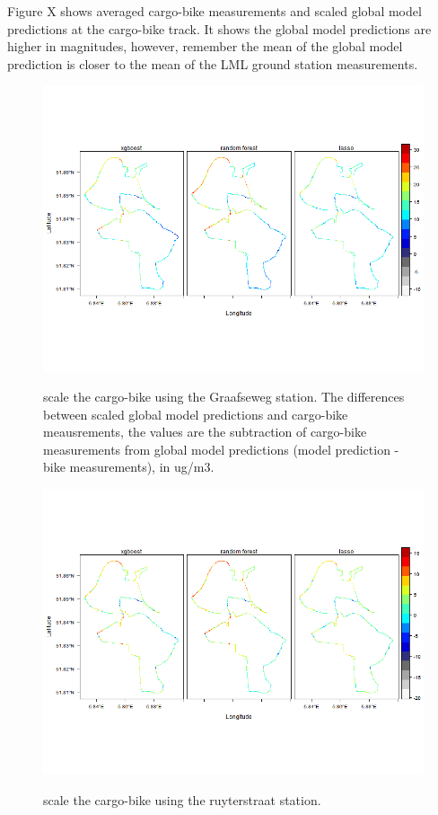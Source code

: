 \documentclass{article}
\begin{document}
Figure X shows averaged cargo-bike measurements and scaled global model predictions at the cargo-bike track. It shows the global model predictions are higher in magnitudes, however, remember the mean of the global model prediction is closer to the mean of the LML ground station measurements. 
\begin{figure}[H]
    \includegraphics[width=\linewidth]{f4a.png}
    \label{Graafseweg}
    \caption {scale the cargo-bike using the Graafseweg station. The differences between scaled global model predictions and cargo-bike meausrements, the values are the subtraction of cargo-bike measurements from global model predictions (model prediction - bike measurements), in ug/m3.}
\end{figure}
\begin{figure}[H]
    \includegraphics[width=\linewidth]{f4b.png}
    \label{ruyterstraat}
    \caption {scale the cargo-bike using the ruyterstraat station.}
\end{figure}
\end{document}
